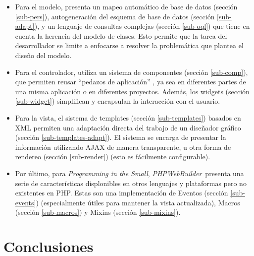 \documentclass[a4paper,10pt,draft]{article}
\newcommand{\PITS}{\emph{Programming in the Small}} %
\newcommand{\PWB}{\emph{PHPWebBuilder}}
\begin{document}
\begin{itemize}
\item Para el modelo, presenta un mapeo automático de base de datos (sección \ref{sub-pers}), autogeneración del esquema de base de datos (sección \ref{sub-adapt}), y un lenguaje de consultas complejas (sección \ref{sub-oql}) que tiene en cuenta la herencia del modelo de clases.  Esto permite que la tarea del desarrollador se limite a enfocarse a resolver la problemática que plantea el diseño del modelo.

\item Para el controlador, utiliza un sistema de componentes (sección \ref{sub-comp}), que permiten reusar ``pedazos de aplicación'' , ya sea en diferentes partes de una misma aplicación o en diferentes proyectos. Además, los widgets (sección \ref{sub-widget}) simplifican y encapsulan la interacción con el usuario.

\item Para la vista, el sistema de templates (sección \ref{sub-templates}) basados en XML permiten una adaptación directa del trabajo de un diseñador gráfico (sección \ref{sub-templates-adapt}). El sistema se encarga de presentar la información utilizando AJAX de manera transparente, u otra forma de rendereo (sección \ref{sub-render}) (esto es fácilmente configurable).

\item Por último, para \PITS, \PWB \ presenta una serie de características displonibles en otros lenguajes y plataformas pero no existentes en PHP. Estas son una implementación de Eventos (sección \ref{sub-events}) (especialmente útiles para mantener la vista actualizada),
Macros (sección \ref{sub-macros}) y Mixins (sección \ref{sub-mixins}).

\end{itemize}






\section{Conclusiones}
\end{document}
